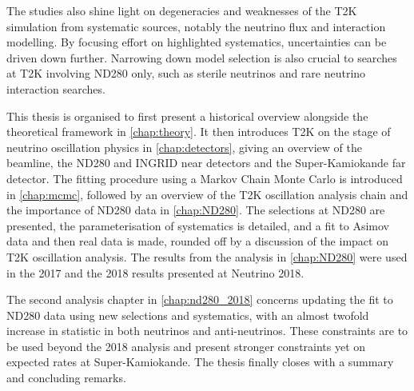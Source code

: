 The studies also shine light on degeneracies and weaknesses of the T2K simulation from systematic sources, notably the neutrino flux and interaction modelling. By focusing effort on highlighted systematics, uncertainties can be driven down further. Narrowing down model selection is also crucial to searches at T2K involving ND280 only, such as sterile neutrinos and rare neutrino interaction searches.

This thesis is organised to first present a historical overview alongside the theoretical framework in \autoref{chap:theory}. It then introduces T2K on the stage of neutrino oscillation physics in \autoref{chap:detectors}, giving an overview of the beamline, the ND280 and INGRID near detectors and the Super-Kamiokande far detector. The fitting procedure using a Markov Chain Monte Carlo is introduced in \autoref{chap:mcmc}, followed by an overview of the T2K oscillation analysis chain and the importance of ND280 data in \autoref{chap:ND280}. The selections at ND280 are presented, the parameterisation of systematics is detailed, and a fit to Asimov data and then real data is made, rounded off by a discussion of the impact on T2K oscillation analysis. The results from the analysis in \autoref{chap:ND280} were used in the 2017\cite{t2k_2017} and the 2018 results presented at Neutrino 2018\cite{t2k_neutrino2018}. 

The second analysis chapter in \autoref{chap:nd280_2018} concerns updating the fit to ND280 data using new selections and systematics, with an almost twofold increase in statistic in both neutrinos and anti-neutrinos. These constraints are to be used beyond the 2018 analysis and present stronger constraints yet on expected rates at Super-Kamiokande. The thesis finally closes with a summary and concluding remarks.